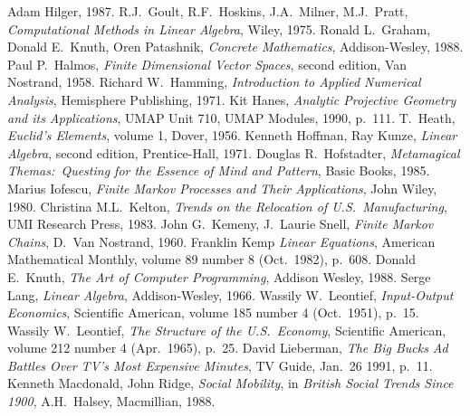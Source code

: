 \begin{thebibliography}{\makebox[2em][c]{{}\hfil{}}}
  Adam Hilger,
  1987.
  R.J.~Goult, R.F.~Hoskins, J.A.~Milner, M.J.~Pratt,
  \emph{Computational Methods in Linear Algebra},
  Wiley,
  1975.
 Ronald L.~Graham, Donald E.~Knuth, Oren Patashnik,
 \emph{Concrete Mathematics},
 Addison-Wesley,
 1988.
  Paul P.~Halmos,
  \emph{Finite Dimensional Vector Spaces},
  second edition,
  Van Nostrand,
  1958.
  Richard W.\ Hamming,
  \emph{Introduction to Applied Numerical Analysis},
  Hemisphere Publishing,
  1971.
  Kit Hanes,
  \emph{Analytic Projective Geometry and its Applications},
  UMAP Unit 710,
  UMAP Modules, 1990,
  p.~111.
  T.\ Heath,
  \emph{Euclid's Elements},
  volume 1,
  Dover,
  1956.
  Kenneth Hoffman, Ray Kunze,
  \emph{Linear Algebra},
  second edition,
  Prentice-Hall,
  1971.
 Douglas R.~Hofstadter,
 \emph{Metamagical Themas:~Questing for the Essence of Mind and Pattern},
 Basic Books,
 1985.
  Marius Iofescu,
  \emph{Finite Markov Processes and Their Applications},
  John Wiley, 1980.
  Christina M.L.~Kelton,
  \emph{Trends on the Relocation of U.S.\ Manufacturing},
  UMI Research Press, 1983.
  John G.~Kemeny, J.~Laurie Snell,
  \emph{Finite Markov Chains},
  D.~Van Nostrand, 1960.
  Franklin Kemp
  \emph{Linear Equations},
  American Mathematical Monthly,
  volume 89 number 8 (Oct.\ 1982),
  p.~608.
  Donald E.~Knuth,
  \emph{The Art of Computer Programming},
  Addison Wesley,
  1988.     
  Serge Lang,
  \emph{Linear Algebra},
  Addison-Wesley,
  1966.
  Wassily W.\ Leontief,
  \emph{Input-Output Economics},
  Scientific American,
  volume 185 number 4 (Oct.\ 1951),
  p.~15. 
  Wassily W.\ Leontief,
  \emph{The Structure of the U.S.\ Economy},
  Scientific American,
  volume 212 number 4 (Apr.\ 1965),
  p.~25. 
  David Lieberman,
  \emph{The Big Bucks Ad Battles Over TV's Most Expensive Minutes},
  TV Guide,
  Jan.\ 26 1991,
  p.~11.
  Kenneth Macdonald, John Ridge,
  \emph{Social Mobility},
  in \emph{British Social Trends Since 1900},
  A.H.~Halsey,
  Macmillian, 1988.

\end{thebibliography}
